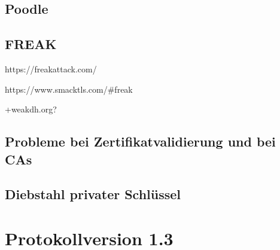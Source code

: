 \documentclass[
    12pt,
    headings=small,
    parskip=half,           %
    bibliography=totoc,
    numbers=noenddot,       %
    open=any,               %
    ]{scrreprt}
\begin{document}
\section{Poodle}


\section{FREAK}

https://freakattack.com/

https://www.smacktls.com/#freak

+weakdh.org?

\section{Probleme bei Zertifikatvalidierung und bei CAs}

\section{Diebstahl privater Schlüssel}


\chapter{Protokollversion 1.3}



\end{document}
